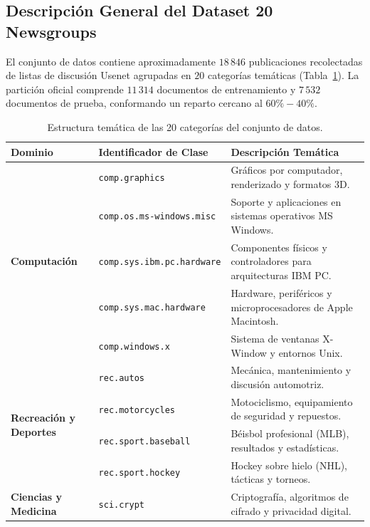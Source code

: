 \documentclass[12pt, a4paper]{article}
\begin{document}
\subsection{Descripción General del Dataset 20 Newsgroups}

El conjunto de datos contiene aproximadamente $18\,846$ publicaciones recolectadas de listas de discusión Usenet agrupadas en $20$ categorías temáticas (Tabla~\ref{tab:categories}). La partición oficial comprende $11\,314$ documentos de entrenamiento y $7\,532$ documentos de prueba, conformando un reparto cercano al $60\% - 40\%$.

\begin{table}[H]
    \centering
    \small
    \caption{Estructura temática de las 20 categorías del conjunto de datos.}
    \label{tab:categories}
    \begin{tabular}{@{}llp{5.6cm}@{}}
        \toprule
        \textbf{Dominio} & \textbf{Identificador de Clase} & \textbf{Descripción Temática} \\
        \midrule
        \multirow{5}{*}{\textbf{Computación}} 
        & \texttt{comp.graphics} & Gráficos por computador, renderizado y formatos 3D. \\
        & \texttt{comp.os.ms-windows.misc} & Soporte y aplicaciones en sistemas operativos MS Windows. \\
        & \texttt{comp.sys.ibm.pc.hardware} & Componentes físicos y controladores para arquitecturas IBM PC. \\
        & \texttt{comp.sys.mac.hardware} & Hardware, periféricos y microprocesadores de Apple Macintosh. \\
        & \texttt{comp.windows.x} & Sistema de ventanas X-Window y entornos Unix. \\
        \midrule
        \multirow{4}{*}{\textbf{Recreación y Deportes}} 
        & \texttt{rec.autos} & Mecánica, mantenimiento y discusión automotriz. \\
        & \texttt{rec.motorcycles} & Motociclismo, equipamiento de seguridad y repuestos. \\
        & \texttt{rec.sport.baseball} & Béisbol profesional (MLB), resultados y estadísticas. \\
        & \texttt{rec.sport.hockey} & Hockey sobre hielo (NHL), tácticas y torneos. \\
        \midrule
        \multirow{4}{*}{\textbf{Ciencias y Medicina}} 
        & \texttt{sci.crypt} & Criptografía, algoritmos de cifrado y privacidad digital. \\

\end{tabular}
\end{table}
\end{document}

